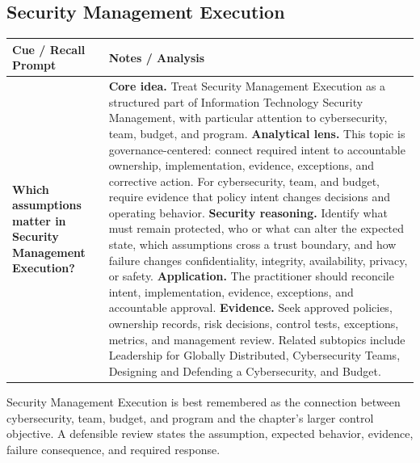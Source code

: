 \documentclass[11pt]{article}
\newcommand{\CornellHeader}{%
\rowcolor{Navy}\color{white}\bfseries Cue / Recall Prompt & \color{white}\bfseries Notes / Analysis\\\hline}
\newcommand{\CornellRow}[2]{%
\cellcolor{CueGray}\RaggedRight\textbf{#1} & \RaggedRight #2\\\hline}
\begin{document}
\subsection*{Security Management Execution}
\begin{longtable}{>{\RaggedRight\arraybackslash}p{}|>{\RaggedRight\arraybackslash}p{}}
\CornellHeader
\CornellRow{Which assumptions matter in Security Management Execution?}{\textbf{Core idea.} Treat Security Management Execution as a structured part of Information Technology Security Management, with particular attention to cybersecurity, team, budget, and program. \textbf{Analytical lens.} This topic is governance-centered: connect required intent to accountable ownership, implementation, evidence, exceptions, and corrective action. For cybersecurity, team, and budget, require evidence that policy intent changes decisions and operating behavior. \textbf{Security reasoning.} Identify what must remain protected, who or what can alter the expected state, which assumptions cross a trust boundary, and how failure changes confidentiality, integrity, availability, privacy, or safety. \textbf{Application.} The practitioner should reconcile intent, implementation, evidence, exceptions, and accountable approval. \textbf{Evidence.} Seek approved policies, ownership records, risk decisions, control tests, exceptions, metrics, and management review. Related subtopics include Leadership for Globally Distributed, Cybersecurity Teams, Designing and Defending a Cybersecurity, and Budget.}
\end{longtable}
\begin{topicsummary}
Security Management Execution is best remembered as the connection between cybersecurity, team, budget, and program and the chapter's larger control objective. A defensible review states the assumption, expected behavior, evidence, failure consequence, and required response.
\end{topicsummary}
\end{document}
